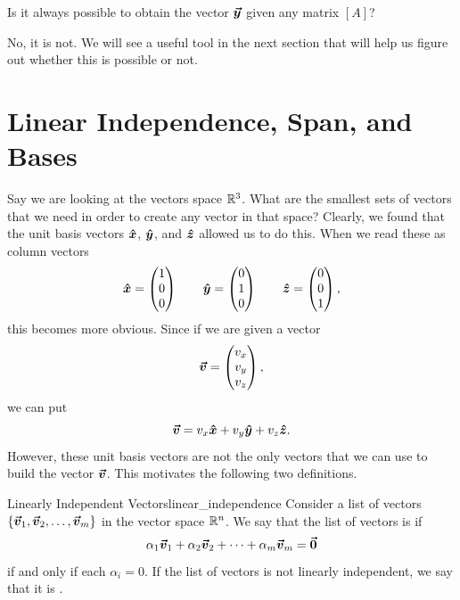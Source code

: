        \begin{question}
        Is it always possible to obtain the vector $\boldsymbol{\boldsymbol{\vec{y}}}$ given any matrix $[A]$?
        \end{question}
        
        \begin{answer}
        No, it is not.  We will see a useful tool in the next section that will help us figure out whether this is possible or not.
        \end{answer}
        
    \section{Linear Independence, Span, and Bases}
    
    Say we are looking at the vectors space $\mathbb{R}^3$. What are the smallest sets of vectors that we need in order to create any vector in that space? Clearly, we found that the unit basis vectors $\boldsymbol{\hat{x}}$, $\boldsymbol{\hat{y}}$, and $\boldsymbol{\hat{z}}$ allowed us to do this.  When we read these as column vectors
    \[
    \boldsymbol{\hat{x}} = \begin{pmatrix} 1 \\ 0 \\ 0 \end{pmatrix} \qquad \boldsymbol{\hat{y}} = \begin{pmatrix} 0 \\ 1 \\ 0 \end{pmatrix} \qquad \boldsymbol{\hat{z}} = \begin{pmatrix} 0 \\ 0 \\ 1 \end{pmatrix},
    \]
    this becomes more obvious.  Since if we are given a vector
    \[
    \boldsymbol{\boldsymbol{\vec{v}}} = \begin{pmatrix} v_x \\ v_y \\ v_z \end{pmatrix},
    \]
    we can put
    \[
    \boldsymbol{\boldsymbol{\vec{v}}} = v_x \boldsymbol{\hat{x}} + v_y \boldsymbol{\hat{y}} + v_z \boldsymbol{\hat{z}}.
    \]
    However, these unit basis vectors are not the only vectors that we can use to build the vector $\boldsymbol{\boldsymbol{\vec{v}}}$. This motivates the following two definitions.
    
    \begin{df}{Linearly Independent Vectors}{linear_independence}
        Consider a list of vectors $\{\boldsymbol{\boldsymbol{\vec{v}}}_1,\boldsymbol{\boldsymbol{\vec{v}}}_2,\dots,\boldsymbol{\boldsymbol{\vec{v}}}_m\}$ in the vector space $\mathbb{R}^n$.  We say that the list of vectors is   if
        \[
        \alpha_1 \boldsymbol{\boldsymbol{\vec{v}}}_1 + \alpha_2 \boldsymbol{\boldsymbol{\vec{v}}}_2 + \cdots + \alpha_m \boldsymbol{\boldsymbol{\vec{v}}}_m =\boldsymbol{\vec{0}}
        \]
        if and only if each $\alpha_i=0$. If the list of vectors is not linearly independent, we say that it is . 
    \end{df}
    
